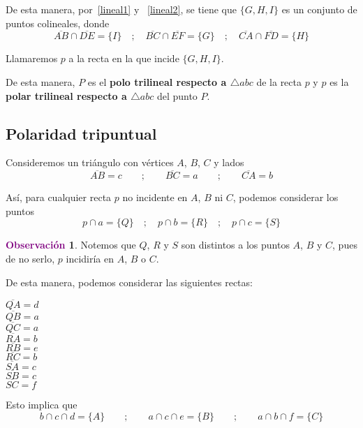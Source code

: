 \documentclass[12pt]{book}
\theoremstyle{definition}
\newtheorem{obs}[teo]{\textcolor{purple}{Observación}}
\begin{document}
De esta manera, por~\ref{lineal1} y ~\ref{lineal2}, se tiene que $\{G,H, I\}$ es un conjunto de puntos colineales, donde
$$\overline{AB} \cap \overline{DE} = \{I\} \quad; \quad \overline{BC} \cap \overline{EF} = \{G\} \quad ; \quad \overline{CA} \cap \overline{FD} = \{H\}$$

Llamaremos $p$ a la recta en la que incide $\{G,H,I\}$.

De esta manera, $P$ es el \textbf{polo trilineal respecto a $\triangle abc$} de la recta $p$ y $p$ es la \textbf{polar trilineal respecto a $\triangle abc$} del punto $P$.


\subsection{Polaridad tripuntual}

Consideremos un triángulo con vértices $A$, $B$, $C$ y lados
$$\overline{AB}= c \qquad ; \qquad \overline{BC} = a \qquad ; \qquad \overline{CA}= b $$

Así, para cualquier recta $p$ no incidente en $A$, $B$ ni $C$, podemos considerar los puntos
$$ p \cap a = \{Q\} \quad ; \quad p \cap b =\{R\} \quad ; \quad p \cap c = \{S\}$$

\begin{obs}
Notemos que $Q$, $R$ y $S$ son distintos a los puntos $A$, $B$ y $C$, pues de no serlo, $p$ incidiría en $A$, $B$ o $C$.
\end{obs}

De esta manera, podemos considerar las siguientes rectas:
\begin{center}
\begin{multicols}{3}
$\overline{QA}= d$\\
$\overline{QB}= a$\\
$\overline{QC}= a$\\
$\overline{RA}= b$\\
$\overline{RB}= e$\\
$\overline{RC}= b$\\
$\overline{SA}= c$\\
$\overline{SB}= c$\\
$\overline{SC}= f$
\end{multicols}
\end{center}

Esto implica que
$$ b \cap c \cap d = \{A\} \qquad ; \qquad a \cap c \cap e =\{B\} \qquad ; \qquad a \cap b \cap f = \{C\}$$
\end{document}
